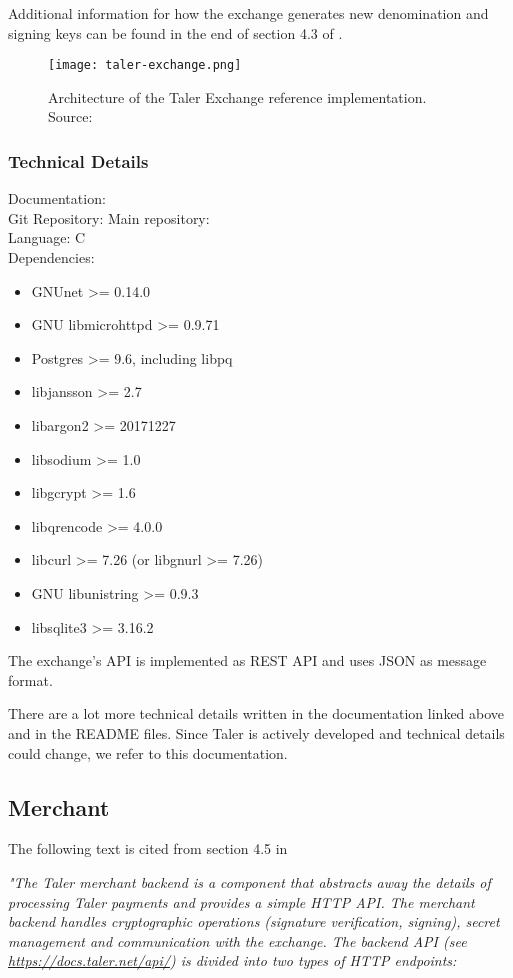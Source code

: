 Additional information for how the exchange generates new denomination and signing keys can be found in the end of section 4.3 of \cite{dold:the-gnu-taler-system}.

\begin{figure}[h!]
    \centering
    \texttt{[image: taler-exchange.png]}
    \caption{Architecture of the Taler Exchange reference implementation. Source: \cite{dold:the-gnu-taler-system}}
    \label{fig:taler-arch-exchange}
\end{figure}

\subsubsection{Technical Details}

Documentation: \cite{taler-documentation:exchange-operator-manual} \\
Git Repository: Main repository: \cite{taler-git:exchange} \\
Language: C \\
Dependencies: 
\begin{itemize}
    \item GNUnet            >= 0.14.0
    \item GNU libmicrohttpd >= 0.9.71
    \item Postgres          >= 9.6, including libpq
    \item libjansson        >= 2.7
    \item libargon2         >= 20171227
    \item libsodium         >= 1.0
    \item libgcrypt         >= 1.6
    \item libqrencode       >= 4.0.0
    \item libcurl           >= 7.26 (or libgnurl >= 7.26)
    \item GNU libunistring  >= 0.9.3
    \item libsqlite3        >= 3.16.2
\end{itemize}
The exchange’s API is implemented as REST API and uses \ac{JSON} as message format.

There are a lot more technical details written in the documentation linked above and in the README files.
Since Taler is actively developed and technical details could change, we refer to this documentation.

\subsection{Merchant}
The following text is cited from section 4.5 in \cite{dold:the-gnu-taler-system}
\begin{center}
    \textit{
        "The Taler merchant backend is a component that abstracts away the details of processing Taler payments and provides a simple HTTP API.
        The merchant backend handles cryptographic operations (signature verification, signing), secret management and communication with the exchange.
        The backend API (see \url{https://docs.taler.net/api/}) is divided into two types of HTTP endpoints:
    }
\end{center}

